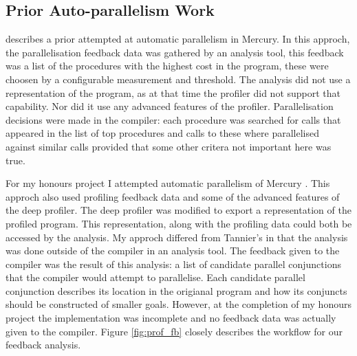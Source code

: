 \subsection{Prior Auto-parallelism Work}

\citet{tannier:2007:parallel_mercury} describes a prior attempted at automatic
parallelism in Mercury.
In this approch, the parallelisation feedback data was gathered by an analysis
tool,
this feedback was a list of the procedures with the highest cost in the program,
these were choosen by a configurable measurement and threshold.
The analysis did not use a representation of the program,
as at that time the profiler did not support that capability.
Nor did it use any advanced features of the profiler.
Parallelisation decisions were made in the compiler:
each procedure was searched for calls that appeared in the list of top procedures
and calls to these where parallelised against similar calls
provided that some other critera not important here was true.

For my honours project I attempted automatic parallelism of Mercury
\citep{paul_hons}.
This approch also used profiling feedback data and some of the advanced
features of the deep profiler.
The deep profiler was modified to export a representation of the profiled
program.
This representation, along with the profiling data could both be accessed by
the analysis.
My approch differed from Tannier's in that the analysis was done outside of the
compiler in an analysis tool.
The feedback given to the compiler was the result of this analysis:
a list of candidate parallel conjunctions that the compiler would attempt to parallelise.
Each candidate parallel conjunction describes its location in the origianal
program and how its conjuncts should be constructed of smaller goals.
However, at the completion of my honours project the implementation was incomplete
and no feedback data was actually given to the compiler.
Figure \ref{fig:prof_fb} closely describes the workflow for our feedback
analysis.


